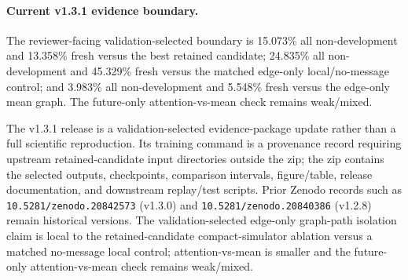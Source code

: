 \documentclass{article}
\begin{document}
\paragraph{Current v1.3.1 evidence boundary.}
The reviewer-facing validation-selected boundary is 15.073\% all non-development and 13.358\% fresh versus the best retained candidate; 24.835\% all non-development and 45.329\% fresh versus the matched edge-only local/no-message control; and 3.983\% all non-development and 5.548\% fresh versus the edge-only mean graph. The future-only attention-vs-mean check remains weak/mixed.

The v1.3.1 release is a validation-selected evidence-package update rather than a full scientific reproduction. Its training command is a provenance record requiring upstream retained-candidate input directories outside the zip; the zip contains the selected outputs, checkpoints, comparison intervals, figure/table, release documentation, and downstream replay/test scripts. Prior Zenodo records such as \nolinkurl{10.5281/zenodo.20842573} (v1.3.0) and \nolinkurl{10.5281/zenodo.20840386} (v1.2.8) remain historical versions. The validation-selected edge-only graph-path isolation claim is local to the retained-candidate compact-simulator ablation versus a matched no-message local control; attention-vs-mean is smaller and the future-only attention-vs-mean check remains weak/mixed.
\end{document}
